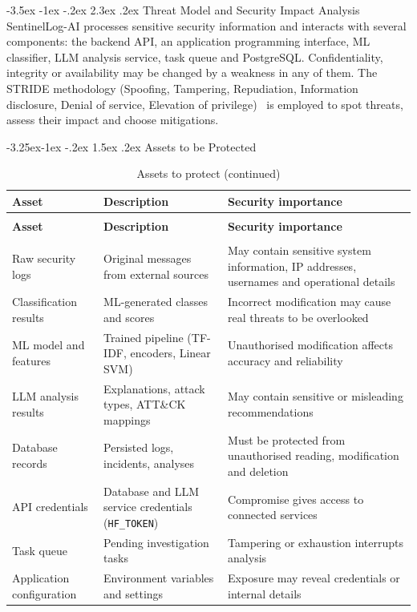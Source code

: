 \documentclass[12pt,a4paper]{report}
\makeatletter
\renewcommand{\arraystretch}{1.05}
\renewcommand\section{\@startsection {section}{1}{\z@}%
  {-3.5ex \@plus -1ex \@minus -.2ex}%
  {2.3ex \@plus .2ex}%
  {\normalfont\fontsize{17}{21}\selectfont\bfseries}}
\renewcommand\subsection{\@startsection{subsection}{2}{\z@}%
  {-3.25ex\@plus -1ex \@minus -.2ex}%
  {1.5ex \@plus .2ex}%
  {\normalfont\fontsize{12}{18}\selectfont\bfseries}}
\makeatother
\begin{document}
\section{Threat Model and Security Impact Analysis}
SentinelLog-AI processes sensitive security information and interacts with several components: the backend API, an application programming interface, ML classifier, LLM analysis service, task queue and PostgreSQL. Confidentiality, integrity or availability may be changed by a weakness in any of them. The STRIDE methodology (Spoofing, Tampering, Repudiation, Information disclosure, Denial of service, Elevation of privilege)~\cite{shostack2014} is employed to spot threats, assess their impact and choose mitigations.

\subsection{Assets to be Protected}
\small
\renewcommand{\arraystretch}{1.2}
\begin{longtable}{>{\raggedright\arraybackslash}p{3.3cm} >{\raggedright\arraybackslash}p{4.6cm} >{\raggedright\arraybackslash}p{7.8cm}}
\caption{Assets to protect}
\label{tab:assets}\\
\toprule
\textbf{Asset} & \textbf{Description} & \textbf{Security importance}\\
\midrule
\endfirsthead
\caption[]{Assets to protect (continued)}\\
\toprule
\textbf{Asset} & \textbf{Description} & \textbf{Security importance}\\
\midrule
\endhead
\midrule
\multicolumn{3}{r}{Continued on next page}\\
\endfoot
\bottomrule
\endlastfoot
Raw security logs & Original messages from external sources & May contain sensitive system information, IP addresses, usernames and operational details\\
Classification results & ML-generated classes and scores & Incorrect modification may cause real threats to be overlooked\\
ML model and features & Trained pipeline (TF-IDF, encoders, Linear SVM) & Unauthorised modification affects accuracy and reliability\\
LLM analysis results & Explanations, attack types, ATT\&CK mappings & May contain sensitive or misleading recommendations\\
Database records & Persisted logs, incidents, analyses & Must be protected from unauthorised reading, modification and deletion\\
API credentials & Database and LLM service credentials (\texttt{HF\_TOKEN}) & Compromise gives access to connected services\\
Task queue & Pending investigation tasks & Tampering or exhaustion interrupts analysis\\
Application configuration & Environment variables and settings & Exposure may reveal credentials or internal details\\
\end{longtable}
\normalsize
\end{document}
